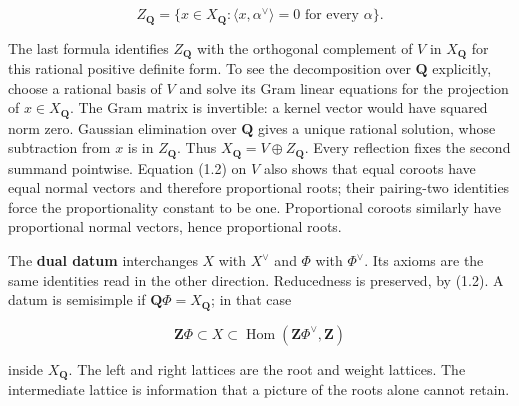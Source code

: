 \documentclass[11pt,a4paper,openany]{report}
\begin{document}
\[
Z_\mathbf Q=\{x\in X_\mathbf Q:\langle x,\alpha^\vee\rangle=0
\text{ for every }\alpha\}.
\]

The last formula identifies \(Z_\mathbf Q\) with the orthogonal complement of \(V\) in \(X_\mathbf Q\) for this rational positive definite form. To see the decomposition over \(\mathbf Q\) explicitly, choose a rational basis of \(V\) and solve its Gram linear equations for the projection of \(x\in X_\mathbf Q\). The Gram matrix is invertible: a kernel vector would have squared norm zero. Gaussian elimination over \(\mathbf Q\) gives a unique rational solution, whose subtraction from \(x\) is in \(Z_\mathbf Q\). Thus \(X_\mathbf Q=V\oplus Z_\mathbf Q\). Every reflection fixes the second summand pointwise. Equation (1.2) on \(V\) also shows that equal coroots have equal normal vectors and therefore proportional roots; their pairing-two identities force the proportionality constant to be one. Proportional coroots similarly have proportional normal vectors, hence proportional roots.

The \textbf{dual datum} interchanges \(X\) with \(X^\vee\) and \(\Phi\) with \(\Phi^\vee\). Its axioms are the same identities read in the other direction. Reducedness is preserved, by (1.2). A datum is semisimple if \(\mathbf Q\Phi=X_\mathbf Q\); in that case

\[
\mathbf Z\Phi\subset X\subset
\operatorname{Hom}(\mathbf Z\Phi^\vee,\mathbf Z)
\]

inside \(X_\mathbf Q\). The left and right lattices are the root and weight lattices. The intermediate lattice is information that a picture of the roots alone cannot retain.
\end{document}
